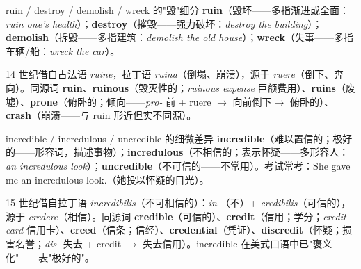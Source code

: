 \documentclass[../main.tex]{subfiles}
\begin{document}



\begin{gram}{ruin / destroy / demolish / wreck 的"毁"细分}
\textbf{ruin}（毁坏——多指渐进或全面：\textit{ruin one's health}）；\textbf{destroy}（摧毁——强力破坏：\textit{destroy the building}）；\textbf{demolish}（拆毁——多指建筑：\textit{demolish the old house}）；\textbf{wreck}（失事——多指车辆/船：\textit{wreck the car}）。
\end{gram}

\begin{origin}
14 世纪借自古法语 \textit{ruine}，拉丁语 \textit{ruina}（倒塌、崩溃），源于 \textit{ruere}（倒下、奔向）。同源词 \textbf{ruin}、\textbf{ruinous}（毁灭性的；\textit{ruinous expense} 巨额费用）、\textbf{ruins}（废墟）、\textbf{prone}（俯卧的；倾向——\textit{pro-} 前 + ruere $\to$ 向前倒下$\to$ 俯卧的）、\textbf{crash}（崩溃——与 ruin 形近但实不同源）。
\end{origin}




\begin{gram}{incredible / incredulous / uncredible 的细微差异}
\textbf{incredible}（难以置信的；极好的——形容词，描述事物）；\textbf{incredulous}（不相信的；表示怀疑——多形容人：\textit{an incredulous look}）；\textbf{uncredible}（不可信的——不常用）。考试常考：She gave me an incredulous look.（她投以怀疑的目光）。
\end{gram}

\begin{origin}
15 世纪借自拉丁语 \textit{incredibilis}（不可相信的）：\textit{in-}（不）+ \textit{credibilis}（可信的），源于 \textit{credere}（相信）。同源词 \textbf{credible}（可信的）、\textbf{credit}（信用；学分；\textit{credit card} 信用卡）、\textbf{creed}（信条；信经）、\textbf{credential}（凭证）、\textbf{discredit}（怀疑；损害名誉；\textit{dis-} 失去 + credit $\to$ 失去信用）。incredible 在美式口语中已"褒义化"——表"极好的"。
\end{origin}
\end{document}

